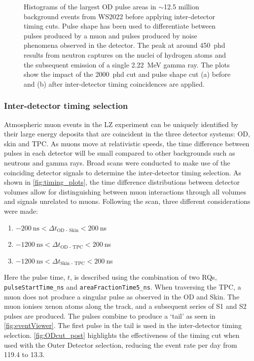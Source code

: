 \begin{figure}[htbp]
{    Histograms of the largest OD pulse areas in $\sim$12.5 million background events from WS2022 before applying inter-detector timing cuts. Pulse shape has been used to differentiate between pulses produced by a muon and pulses produced by noise phenomena observed in the detector. The peak at around 450~phd results from neutron captures on the nuclei of hydrogen atoms and the subsequent emission of a single 2.22~MeV gamma ray. The plots show the impact of the 2000~phd cut and pulse shape cut (a) before and (b) after inter-detector timing coincidences are applied.}%
    \label{fig:ODSpectra}
\end{figure}

\subsubsection{Inter-detector timing selection}
Atmospheric muon events in the LZ experiment can be uniquely identified by their large energy deposits that are coincident in the three detector systems: OD, skin and TPC. As muons move at relativistic speeds, the time difference between pulses in each detector will be small compared to other backgrounds such as neutrons and gamma rays.
Broad scans were conducted to make use of the coinciding detector signals to determine the inter-detector timing selection. As shown in \autoref{fig:timing_plots}, the time difference distributions between detector volumes allow for distinguishing between muon interactions through all volumes and signals unrelated to muons. Following the scan, three different considerations were made:
 \begin{enumerate}
    \item $-200~\text{ns} < \Delta t_{\text{OD - Skin}} < 200~$ns
    \item $-1200~\text{ns} < \Delta t_{\text{OD - TPC}} < 200~$ns
    \item $-1200~\text{ns} < \Delta t_{\text{Skin - TPC}} < 200~$ns
\end{enumerate}
Here the pulse time, $t$, is described using the combination of two RQs, \texttt{pulseStartTime\_ns} and \texttt{areaFractionTime5\_ns}. When traversing the TPC, a muon does not produce a singular pulse as observed in the OD and Skin. The muon ionises xenon atoms along the track, and a subsequent series of S1 and S2 pulses are produced. The pulses combine to produce a `tail' as seen in \autoref{fig:eventViewer}. The first pulse in the tail is used in the inter-detector timing selection. \autoref{fig:ODcut_post} highlights the effectiveness of the timing cut when used with the Outer Detector selection, reducing the event rate per day from 119.4 to 13.3.

